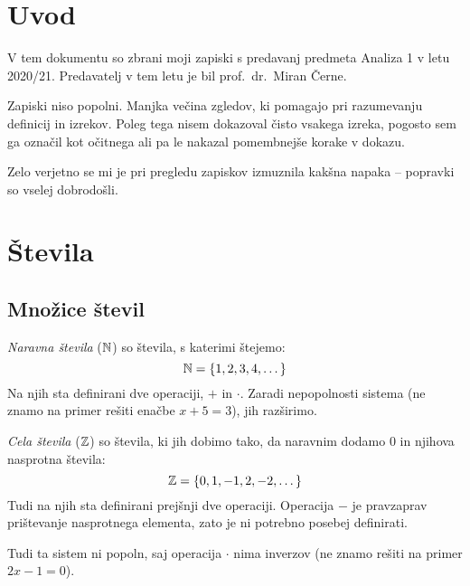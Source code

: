 \documentclass[12pt, a4paper]{article}
\begin{document}
\renewcommand{\headheight}{20pt}

\maketitle

\newpage

\tableofcontents

\newpage

\section*{Uvod}

V tem dokumentu so zbrani moji zapiski s predavanj predmeta Analiza 1 v letu 2020/21. Predavatelj v tem letu je bil prof.~dr.~Miran Černe.

Zapiski niso popolni. Manjka večina zgledov, ki pomagajo pri razumevanju definicij in izrekov. Poleg tega nisem dokazoval čisto vsakega izreka, pogosto sem ga označil kot očitnega ali pa le nakazal pomembnejše korake v dokazu.

Zelo verjetno se mi je pri pregledu zapiskov izmuznila kakšna napaka -- popravki so vselej dobrodošli.

\newpage

\section{Števila}

\subsection{Množice števil}

\begin{definicija}
\emph{Naravna števila} ($\mathbb{N}$) so števila, s katerimi štejemo:
\[
\mathbb{N}=\left\{1,2,3,4,\dots\right\}
\]
Na njih sta definirani dve operaciji, $+$ in $\cdot$. Zaradi nepopolnosti sistema (ne znamo na primer rešiti enačbe $x+5=3$), jih razširimo.
\end{definicija}

\begin{definicija}
\emph{Cela števila} ($\mathbb{Z}$) so števila, ki jih dobimo tako, da naravnim dodamo 0 in njihova nasprotna števila:
\[
\mathbb{Z}=\left\{0,1,-1,2,-2,\dots\right\}
\]
Tudi na njih sta definirani prejšnji dve operaciji. Operacija $-$ je pravzaprav prištevanje nasprotnega elementa, zato je ni potrebno posebej definirati.

Tudi ta sistem ni popoln, saj operacija $\cdot$ nima inverzov (ne znamo rešiti na primer $2x-1=0$).
\end{definicija}
\end{document}
